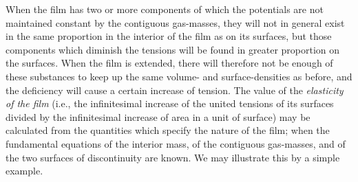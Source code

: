 \documentclass[12pt]{article}
\begin{document}
When the film has two or more components of which the potentials are not maintained constant by the contiguous gas-masses, they will not in general exist in the same proportion in the interior of the film as on its surfaces, but those components which diminish the tensions will be found in greater proportion on the surfaces. When the film is extended, there will therefore not be enough of these substances to keep up the same volume- and surface-densities as before, and the deficiency will cause a certain increase of tension. The value of the \textit{elasticity of the film} (i.e., the infinitesimal increase of the united tensions of its surfaces divided by the infinitesimal increase of area in a unit of surface) may be calculated from the quantities which specify the nature of the film; when the fundamental equations of the interior mass, of the contiguous gas-masses, and of the two surfaces of discontinuity are known. We may illustrate this by a simple example.
\end{document}
